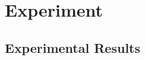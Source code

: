 \section{Experiment}
\label{sec:experiment}

\newcommand{\takeaway}[1]{
\vspace{6pt}
\noindent\fbox{\parbox{\textwidth}{#1}}
\vspace{6pt}
}


\subsection{Experimental Results}

 